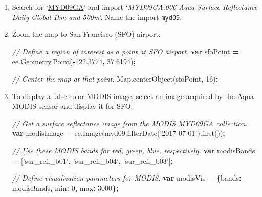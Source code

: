 \documentclass[
]{article}
\newenvironment{Shaded}{\begin{snugshade}}{\end{snugshade}}
\newcommand{\AttributeTok}[1]{\textcolor[rgb]{0.77,0.63,0.00}{#1}}
\newcommand{\CommentTok}[1]{\textcolor[rgb]{0.56,0.35,0.01}{\textit{#1}}}
\newcommand{\DataTypeTok}[1]{\textcolor[rgb]{0.13,0.29,0.53}{#1}}
\newcommand{\DecValTok}[1]{\textcolor[rgb]{0.00,0.00,0.81}{#1}}
\newcommand{\FloatTok}[1]{\textcolor[rgb]{0.00,0.00,0.81}{#1}}
\newcommand{\KeywordTok}[1]{\textcolor[rgb]{0.13,0.29,0.53}{\textbf{#1}}}
\newcommand{\NormalTok}[1]{#1}
\newcommand{\OperatorTok}[1]{\textcolor[rgb]{0.81,0.36,0.00}{\textbf{#1}}}
\newcommand{\StringTok}[1]{\textcolor[rgb]{0.31,0.60,0.02}{#1}}
\newcommand{\VariableTok}[1]{\textcolor[rgb]{0.00,0.00,0.00}{#1}}
\begin{document}
\begin{enumerate}
\def\labelenumi{\arabic{enumi}.}
\item
  Search for `\href{https://lpdaac.usgs.gov/dataset_discovery/modis/modis_products_table/myd09ga_v006}{MYD09GA}' and import `\emph{MYD09GA.006 Aqua Surface Reflectance Daily Global 1km and 500m}'. Name the import \texttt{myd09}.
\item
  Zoom the map to San Francisco (SFO) airport:

\begin{Shaded}
\begin{Highlighting}[]
\CommentTok{// Define a region of interest as a point at SFO airport.}
\KeywordTok{var}\NormalTok{ sfoPoint }\OperatorTok{=} \VariableTok{ee}\NormalTok{.}\VariableTok{Geometry}\NormalTok{.}\AttributeTok{Point}\NormalTok{(}\OperatorTok{-}\FloatTok{122.3774}\OperatorTok{,} \FloatTok{37.6194}\NormalTok{)}\OperatorTok{;}

\CommentTok{// Center the map at that point.}
\VariableTok{Map}\NormalTok{.}\AttributeTok{centerObject}\NormalTok{(sfoPoint}\OperatorTok{,} \DecValTok{16}\NormalTok{)}\OperatorTok{;}
\end{Highlighting}
\end{Shaded}
\item
  To display a false-color MODIS image, select an image acquired by the Aqua MODIS sensor and display it for SFO:

\begin{Shaded}
\begin{Highlighting}[]
\CommentTok{// Get a surface reflectance image from the MODIS MYD09GA collection.}
\KeywordTok{var}\NormalTok{ modisImage }\OperatorTok{=} \VariableTok{ee}\NormalTok{.}\AttributeTok{Image}\NormalTok{(}\VariableTok{myd09}\NormalTok{.}\AttributeTok{filterDate}\NormalTok{(}\StringTok{'2017-07-01'}\NormalTok{).}\AttributeTok{first}\NormalTok{())}\OperatorTok{;}

\CommentTok{// Use these MODIS bands for red, green, blue, respectively.}
\KeywordTok{var}\NormalTok{ modisBands }\OperatorTok{=}\NormalTok{ [}\StringTok{'sur_refl_b01'}\OperatorTok{,} \StringTok{'sur_refl_b04'}\OperatorTok{,} \StringTok{'sur_refl_b03'}\NormalTok{]}\OperatorTok{;}

\CommentTok{// Define visualization parameters for MODIS.}
\KeywordTok{var}\NormalTok{ modisVis }\OperatorTok{=} \OperatorTok{\{}\DataTypeTok{bands}\OperatorTok{:}\NormalTok{ modisBands}\OperatorTok{,} \DataTypeTok{min}\OperatorTok{:} \DecValTok{0}\OperatorTok{,} \DataTypeTok{max}\OperatorTok{:} \DecValTok{3000}\OperatorTok{\};}


\end{Highlighting}
\end{Shaded}
\end{enumerate}
\end{document}
